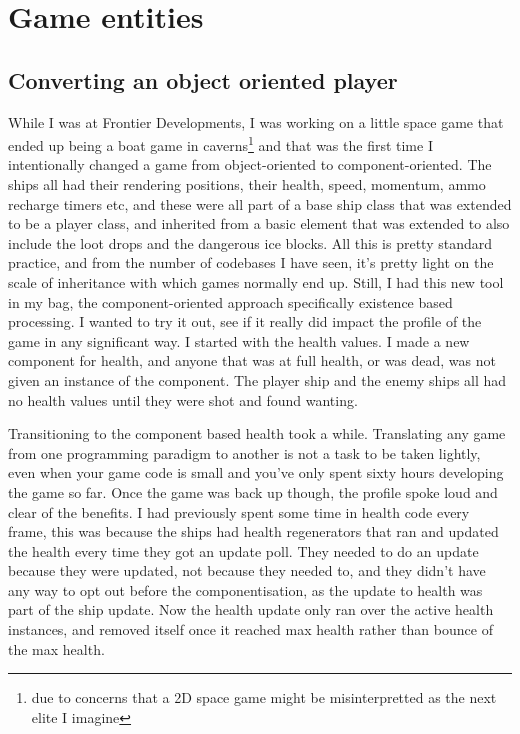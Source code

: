 \section{Game entities}

\subsection{Converting an object oriented player}

While I was at Frontier Developments, I was working on a little space game that
ended up being a boat game in caverns\footnote{due to concerns that a 2D space
game might be misinterpretted as the next elite I imagine} and that was the
first time I intentionally changed a game from object-oriented to
component-oriented. The ships all had their rendering positions, their health,
speed, momentum, ammo recharge timers etc, and these were all part of a base
ship class that was extended to be a player class, and inherited from a basic
element that was extended to also include the loot drops and the dangerous ice
blocks. All this is pretty standard practice, and from the number of codebases
I have seen, it's pretty light on the scale of inheritance with which games
normally end up. Still, I had this new tool in my bag, the component-oriented
approach specifically existence based processing. I wanted to try it out, see
if it really did impact the profile of the game in any significant way. I
started with the health values. I made a new component for health, and anyone
that was at full health, or was dead, was not given an instance of the
component. The player ship and the enemy ships all had no health values until
they were shot and found wanting.

Transitioning to the component based health took a while. Translating any game
from one programming paradigm to another is not a task to be taken lightly,
even when your game code is small and you've only spent sixty hours developing
the game so far. Once the game was back up though, the profile spoke loud and
clear of the benefits. I had previously spent some time in health code every
frame, this was because the ships had health regenerators that ran and updated
the health every time they got an update poll. They needed to do an update
because they were updated, not because they needed to, and they didn't have any
way to opt out before the componentisation, as the update to health was part of
the ship update. Now the health update only ran over the active health
instances, and removed itself once it reached max health rather than bounce of
the max health.

